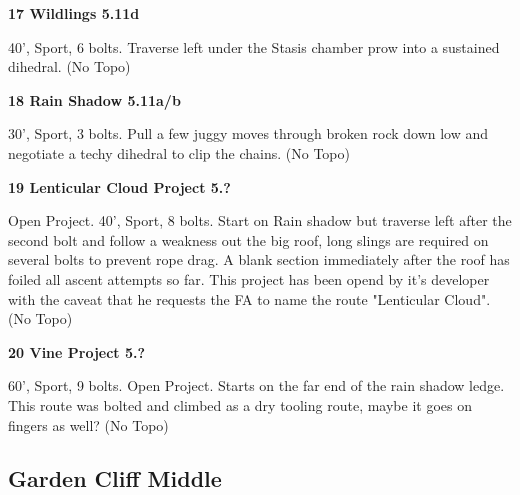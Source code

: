 \begin{multicols}{2}
\begin{adjustwidth}{0.5cm}{}
\end{adjustwidth}


\needspace{1.5cm}
\label{rt:Wildlings}
\colorbox{RoyalBlue!20}{
\parbox{0.95\linewidth}{
\textbf{
17 Wildlings 5.11d  
}}}
\begin{adjustwidth}{0.5cm}{}			
40', Sport, 6 bolts. Traverse left under the Stasis chamber prow into a sustained dihedral.
  (No Topo)
\end{adjustwidth}




\needspace{1.5cm}
\label{rt:Rain Shadow}
\colorbox{RoyalBlue!20}{
\parbox{0.95\linewidth}{
\textbf{
18 Rain Shadow 5.11a/b  
}}}
\begin{adjustwidth}{0.5cm}{}			
30', Sport, 3 bolts. Pull a few juggy moves through broken rock down low and negotiate a techy dihedral to clip the chains.
  (No Topo)
\end{adjustwidth}




\needspace{1.5cm}
\label{rt:Lenticular Cloud Project}
\colorbox{black!20}{
\parbox{0.95\linewidth}{
\textbf{
19 Lenticular Cloud Project 5.?  
}}}
\begin{adjustwidth}{0.5cm}{}			
Open Project. 40', Sport, 8 bolts. Start on Rain shadow but traverse left after the second bolt and follow a weakness out the big roof, long slings are required on several bolts to prevent rope drag. A blank section immediately after the roof has foiled all ascent attempts so far. This project has been opend by it's developer with the caveat that he requests the FA to name the route "Lenticular Cloud".
  (No Topo)
\end{adjustwidth}




\needspace{1.5cm}
\label{rt:Vine Project}
\colorbox{black!20}{
\parbox{0.95\linewidth}{
\textbf{
20 Vine Project 5.?  
}}}
\begin{adjustwidth}{0.5cm}{}			
60', Sport, 9 bolts. Open Project. Starts on the far end of the rain shadow ledge. This route was bolted and climbed as a dry tooling route, maybe it goes on fingers as well?
  (No Topo)
\end{adjustwidth}





\needspace{1.5cm}
\subsection*{Garden Cliff Middle}\label{bf:Garden Cliff Middle}
	



\end{multicols}

